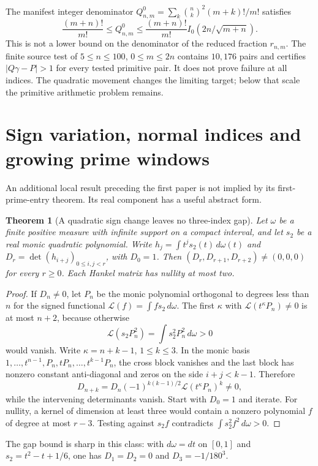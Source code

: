 \documentclass[11pt,a4paper]{article}
\newtheorem{theorem}{Theorem}[section]
\theoremstyle{definition}
\theoremstyle{remark}
\numberwithin{equation}{section}
\begin{document}
The manifest integer denominator
$Q^0_{n,m}=\sum_k\binom nk^2(m+k)!/m!$ satisfies
\[
 \frac{(m+n)!}{m!}\le Q^0_{n,m}
 \le\frac{(m+n)!}{m!}I_0(2n/\sqrt{m+n}).
\]
This is not a lower bound on the denominator of the reduced fraction
$r_{n,m}$.  The finite source test of $5\le n\le100$, $0\le m\le2n$
contains $10{,}176$ pairs and certifies $|Q\gamma-P|>1$ for every tested
primitive pair.  It does not prove failure at all indices.  The quadratic
movement changes the limiting target; below that scale the primitive
arithmetic problem remains.

\section{Sign variation, normal indices and growing prime windows}
\label{ec:normal-indices}

An additional local result preceding the first paper is not implied by
its first-prime-entry theorem.  Its real component has a useful abstract
form.

\begin{theorem}[A quadratic sign change leaves no three-index gap]
\label{ec:normal-theorem}
Let $\omega$ be a finite positive measure with infinite support on a
compact interval, and let $s_2$ be a real monic quadratic polynomial.
Write $h_j=\int t^js_2(t)\,d\omega(t)$ and
$D_r=\det(h_{i+j})_{0\le i,j<r}$, with $D_0=1$.
Then $(D_r,D_{r+1},D_{r+2})\ne(0,0,0)$ for every $r\ge0$.
Each Hankel matrix has nullity at most two.
\end{theorem}
\begin{proof}
If $D_n\ne0$, let $P_n$ be the monic polynomial orthogonal to degrees
less than $n$ for the signed functional
$\mathcal L(f)=\int fs_2\,d\omega$.  The first $\kappa$ with
$\mathcal L(t^\kappa P_n)\ne0$ is at most $n+2$, because otherwise
\[
 \mathcal L(s_2P_n^2)=\int s_2^2P_n^2\,d\omega>0
\]
would vanish.  Write $\kappa=n+k-1$, $1\le k\le3$.  In the monic
basis $1,\ldots,t^{n-1},P_n,tP_n,\ldots,t^{k-1}P_n$, the cross block
vanishes and the last block has nonzero constant anti-diagonal and zeros on the side $i+j<k-1$.  Therefore
\[
 D_{n+k}=D_n(-1)^{k(k-1)/2}\mathcal L(t^\kappa P_n)^k\ne0,
\]
while the intervening determinants vanish.  Start with $D_0=1$ and
iterate.  For nullity, a kernel of dimension at least three would contain
a nonzero polynomial $f$ of degree at most $r-3$.  Testing against
$s_2f$ contradicts $\int s_2^2f^2\,d\omega>0$.
\end{proof}
The gap bound is sharp in this class: with $d\omega=dt$ on $[0,1]$ and
$s_2=t^2-t+1/6$, one has $D_1=D_2=0$ and $D_3=-1/180^3$.
\end{document}

